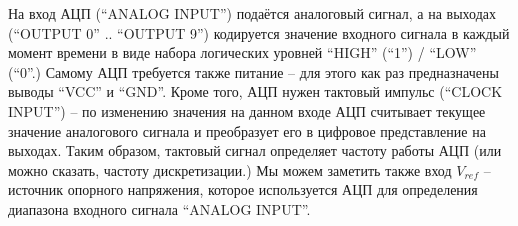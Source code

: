 \documentclass[../sparc.tex]{subfiles}
\begin{document}
На вход АЦП (``ANALOG INPUT'') подаётся аналоговый сигнал, а на выходах
(``OUTPUT 0'' .. ``OUTPUT 9'') кодируется значение входного сигнала в каждый
момент времени в виде набора логических уровней ``HIGH'' (``1'') / ``LOW''
(``0''.)  Самому АЦП требуется также питание -- для этого как раз предназначены
выводы ``VCC'' и ``GND''.  Кроме того, АЦП нужен тактовый импульс (``CLOCK
INPUT'') -- по изменению значения на данном входе АЦП считывает текущее значение
аналогового сигнала и преобразует его в цифровое представление на выходах.
Таким образом, тактовый сигнал определяет частоту работы АЦП (или можно сказать,
частоту дискретизации.)  Мы можем заметить также вход $V_{ref}$ -- источник
опорного напряжения, которое используется АЦП для определения диапазона входного
сигнала ``ANALOG INPUT''.

\end{document}
